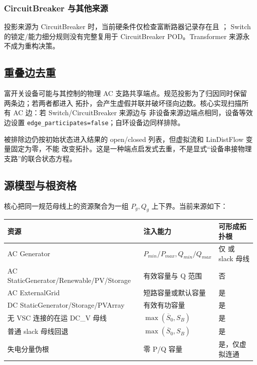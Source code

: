 \subsubsection{CircuitBreaker 与其他来源}

投影来源为 CircuitBreaker 时，当前硬条件仅检查富断路器记录存在且 ；
Switch 的锁定/能力细分规则没有完整复用于 CircuitBreaker POD。Transformer 来源永不成为重构决策。

\subsection{重叠边去重}

富开关设备可能与其控制的物理 AC 支路共享端点。规范投影为了归因同时保留两条边；若两者都进入
拓扑，会产生虚假并联并破坏径向边数。核心实现扫描所有 AC 边：若 Switch/CircuitBreaker 来源边与
非设备来源边端点相同，设备等效边设置 \texttt{edge\_participates=false}；自环设备边同样排除。

被排除边仍按初始状态进入结果的 open/closed 列表，但虚拟流和 LinDistFlow 变量固定为零，不能
改变拓扑。这是一种端点启发式去重，不是显式“设备串接物理支路”的联合状态方程。

\subsection{源模型与根资格}

核心把同一规范母线上的资源聚合为一组 $P_g,Q_g$ 上下界。当前来源如下：
\begin{center}\small
\begin{tabular}{@{}L{4.4cm}L{4.0cm}L{6.0cm}@{}}
\toprule
资源 & 注入能力 & 可形成拓扑根\\
\midrule
AC Generator & $P_{min}/P_{max},Q_{min}/Q_{max}$ & 仅  或 slack 母线\\
AC StaticGenerator/Renewable/PV/Storage & 有效容量与 Q 范围 & 否\\
AC ExternalGrid & 短路容量或默认容量 & 是\\
DC StaticGenerator/Storage/PVArray & 有效有功容量 & 是\\
无 VSC 连接的在运 DC\_V 母线 & $\max(\overline S_0,S_B)$ & 是\\
普通 slack 母线回退 & $\max(\overline S_0,S_B)$ & 是\\
失电分量伪根 & 零 P/Q 容量 & 是，仅虚拟连通\\
\bottomrule
\end{tabular}
\end{center}

